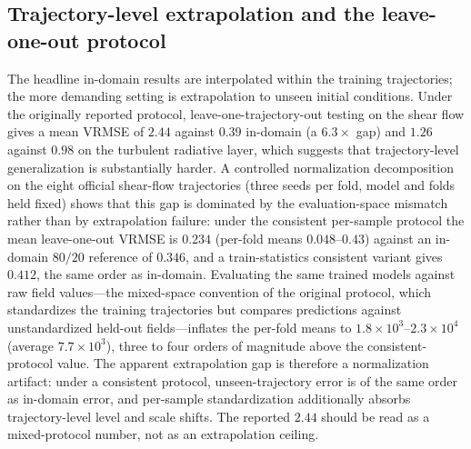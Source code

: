 \documentclass[preprint,12pt]{elsarticle}
\begin{document}
\subsection{Trajectory-level extrapolation and the leave-one-out protocol}
The headline in-domain results are interpolated within the training trajectories; the more demanding
setting is extrapolation to unseen initial conditions. Under the originally reported protocol,
leave-one-trajectory-out testing on the shear flow gives a mean VRMSE of $2.44$ against $0.39$
in-domain (a $6.3\times$ gap) and $1.26$ against $0.98$ on the turbulent radiative layer, which
suggests that trajectory-level generalization is substantially harder. A controlled normalization
decomposition on the eight official shear-flow trajectories (three seeds per fold, model and folds
held fixed) shows that this gap is dominated by the evaluation-space mismatch rather than by
extrapolation failure: under the consistent per-sample protocol the mean leave-one-out VRMSE is
$0.234$ (per-fold means $0.048$--$0.43$) against an in-domain $80/20$ reference of $0.346$, and a
train-statistics consistent variant gives $0.412$, the same order as in-domain. Evaluating the same
trained models against raw field values---the mixed-space convention of the original protocol, which
standardizes the training trajectories but compares predictions against unstandardized held-out
fields---inflates the per-fold means to $1.8\times10^{3}$--$2.3\times10^{4}$ (average
$7.7\times10^{3}$), three to four orders of magnitude above the consistent-protocol value. The
apparent extrapolation gap is therefore a normalization artifact: under a consistent protocol,
unseen-trajectory error is of the same order as in-domain error, and per-sample standardization
additionally absorbs trajectory-level level and scale shifts. The reported $2.44$ should be read as
a mixed-protocol number, not as an extrapolation ceiling.
\end{document}
